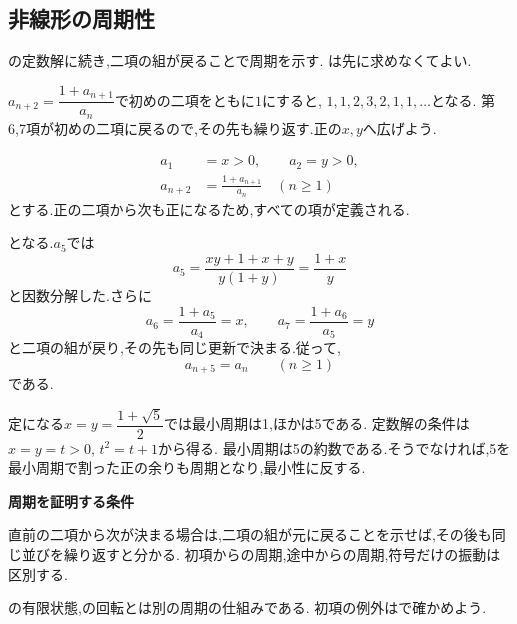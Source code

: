 \subsection{非線形の周期性}\label{節：非線形の周期性}
  の定数解に続き,二項の組が戻ることで周期を示す.
  は先に求めなくてよい.

  $a_{n+2}=\dfrac{1+a_{n+1}}{a_n}$で初めの二項をともに$1$にすると,
  $1,1,2,3,2,1,1,\ldots$となる.
  第6,7項が初めの二項に戻るので,その先も繰り返す.正の$x,y$へ広げよう.

  \[
    \begin{aligned}
      a_1&=x>0,\qquad a_2=y>0,\\
      a_{n+2}&=\frac{1+a_{n+1}}{a_n}\quad(n\ge1)
    \end{aligned}
  \]
  とする.正の二項から次も正になるため,すべての項が定義される.

  \BookMathLayout{\[
    a_3=\frac{1+y}{x},\qquad
    a_4=\frac{1+x+y}{xy},\qquad
    a_5=\frac{1+x}{y}
  \]}{\[
    \begin{aligned}
      a_3&=\frac{1+y}{x},\\
      a_4&=\frac{1+x+y}{xy},\\
      a_5&=\frac{1+x}{y}
    \end{aligned}
  \]}
  となる.$a_5$では
  \[
    a_5=\frac{xy+1+x+y}{y(1+y)}=\frac{1+x}{y}
  \]
  と因数分解した.さらに
  \[
    a_6=\frac{1+a_5}{a_4}=x,\qquad
    a_7=\frac{1+a_6}{a_5}=y
  \]
  と二項の組が戻り,その先も同じ更新で決まる.従って,
  \[
    a_{n+5}=a_n\qquad(n\ge1)
  \]
  である.

  定になる$x=y=\dfrac{1+\sqrt5}{2}$では最小周期は1,ほかは5である.
  定数解の条件は$x=y=t>0$, $t^2=t+1$から得る.
  最小周期は5の約数である.そうでなければ,5を最小周期で割った正の余りも周期となり,最小性に反する.

  \begin{bookpoint}
    \textbf{周期を証明する条件}\par
    直前の二項から次が決まる場合は,二項の組が元に戻ることを示せば,その後も同じ並びを繰り返すと分かる.
    初項からの周期,途中からの周期,符号だけの振動は区別する.
  \end{bookpoint}
  の有限状態,の回転とは別の周期の仕組みである.
  初項の例外はで確かめよう.
